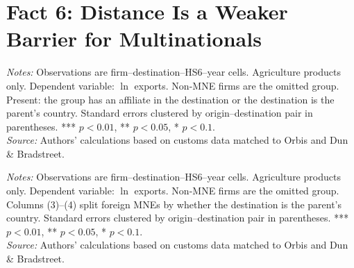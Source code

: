 \documentclass[11pt,a4paper]{article}
\begin{document}
\section{Fact 6: Distance Is a Weaker Barrier for Multinationals}\label{sec:f6_agro}
\begin{table}[H]\centering\small%
  \caption{Agriculture: Distance and Firm Exports: Multinationals by Presence at the Destination}%
  \label{tab:t2_agro}%
  \par\vspace{3pt}%
  \begin{minipage}{0.95\textwidth}\footnotesize %
  \textit{Notes:} Observations are firm--destination--HS6--year cells. Agriculture products only. Dependent variable: $\ln$ exports. Non-MNE firms are the omitted group. Present: the group has an affiliate in the destination or the destination is the parent's country. Standard errors clustered by origin--destination pair in parentheses. *** $p<0.01$, ** $p<0.05$, * $p<0.1$.\\[3pt]%
  \textit{Source:} Authors' calculations based on customs data matched to Orbis and Dun \& Bradstreet.%
  \end{minipage}%
  \end{table}
\begin{table}[H]\centering\small%
  \caption{Agriculture: Distance and Firm Exports: Foreign and Domestic Multinationals}%
  \label{tab:dist_agro}%
  \par\vspace{3pt}%
  \begin{minipage}{0.95\textwidth}\footnotesize %
  \textit{Notes:} Observations are firm--destination--HS6--year cells. Agriculture products only. Dependent variable: $\ln$ exports. Non-MNE firms are the omitted group. Columns (3)--(4) split foreign MNEs by whether the destination is the parent's country. Standard errors clustered by origin--destination pair in parentheses. *** $p<0.01$, ** $p<0.05$, * $p<0.1$.\\[3pt]%
  \textit{Source:} Authors' calculations based on customs data matched to Orbis and Dun \& Bradstreet.%
  \end{minipage}%
  \end{table}
\end{document}
